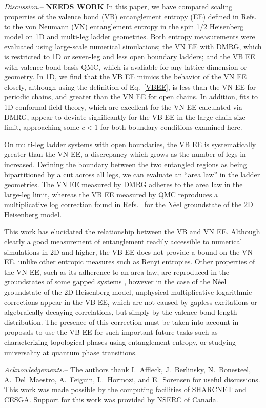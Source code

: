 \documentclass[prl,aps,twocolumn,floatfix,amsmath,amssymb,superscriptaddress,tightenlines]{revtex4}
\begin{document}
{\it Discussion.}-- {\bf NEEDS WORK} In this paper, we have compared scaling properties of
the valence bond (VB) entanglement entropy (EE) defined in
Refs.~\cite{Alet,Chh} to the von Neumann (VN) entanglement entropy in the
spin 1/2 Heisenberg model on 1D and multi-leg ladder geometries.  Both
entropy measurements were evaluated using large-scale numerical
simulations; the VN EE with DMRG, which is restricted to 1D or seven-leg
and less open boundary ladders; and the VB EE with valence-bond basis QMC,
which is avaliable for any lattice dimension or geometry. In 1D, we find
that the VB EE mimics the behavior of the VN EE closely, although using
the definition of Eq.~\eqref{VBEE}, is less than the VN EE for periodic
chains, and greater than the VN EE for open chains. In addition, fits to
1D conformal field theory, which are excellent for the VN EE calculated
via DMRG, appear to deviate significantly for the VB EE in the large
chain-size limit, approaching some $c<1$ for both boundary conditions
examined here.

On multi-leg ladder systems with open boundaries, the VB EE is
systematically greater than the VN EE, a discrepancy which grows as the
number of legs in increased.  Defining the boundary between the two
entangled regions as being bipartitioned by a cut across all legs, we can
evaluate an ``area law'' in the ladder geometries.  The VN EE measured by
DMRG adheres to the area law in the large-leg limit, whereas the VB EE
measured by QMC reproduces a multiplicative log correction found in
Refs.~\cite{Alet,Chh} for the N\'eel groundstate of the 2D Heisenberg
model.

This work has elucidated the relationship between the VB and VN EE.
Although clearly a good measurement of entanglement readily accessible to
numerical simulations in 2D and higher, the VB EE does not provide a bound
on the VN EE, unlike other entropic measures such as Renyi entropies.
Other properties of the VN EE, such as its adherence to an area law, are
reproduced in the groundstates of some gapped systems \cite{Alet,Chh},
however in the case of the N\'eel groundstate of the 2D Heisenberg model,
unphysical multiplicative logarithmic corrections appear in the VB EE,
which are not caused by gapless excitations or algebraically decaying
correlations, but simply by the valence-bond length distribution.
The presence of this correction must
be taken into account in proposals to use the VB EE for such important
future tasks such as characterizing topological phases using entanglement
entropy, or studying universality at quantum phase transitions.

{\it Acknowledgements.}-- The authors thank I.~Affleck, J.~Berlinsky,
N.~Bonesteel,
A.~Del~Maestro, A.~Feiguin, L.~Hormozi, and E.~Sorensen for useful
discussions.  This work was made possible by the computing facilities of
SHARCNET and CESGA.  Support for this work was provided by NSERC of
Canada.


\end{document}
